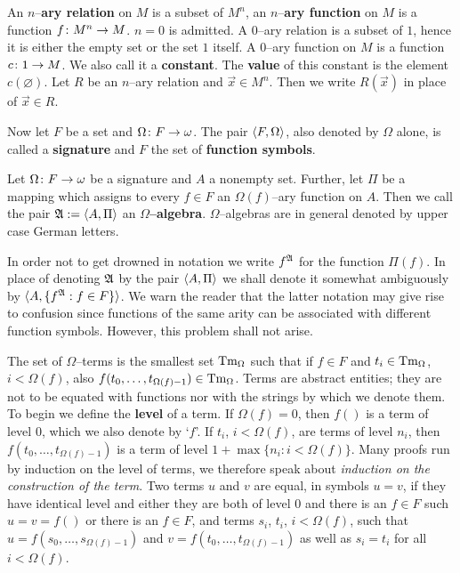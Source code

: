 An $n$--\textbf{ary relation} on $M$ is a subset of $M^n$,
an $n$--\textbf{ary function} on $M$ is a function $f \colon M^n \rightarrow M$.
$n = 0$ is admitted. A 0--ary relation is a subset of $1$, hence 
it is either the empty set or the set $1$ itself. A 0--ary function 
on $M$ is a function $c \colon 1 \rightarrow M$. We also call it a 
\textbf{constant}.
The \textbf{value} of this constant is the element $c(\varnothing)$.
Let $R$ be an $n$--ary relation and $\vec{x} \in M^n$. Then we
write $R(\vec{x})$ in place of $\vec{x} \in R$.

Now let $F$ be a set and $\Omega \colon F \rightarrow \omega$.
The pair $\langle F, \Omega\rangle$, also denoted by $\Omega$
alone, is called a \textbf{signature} and $F$ the set of
\textbf{function symbols}.
\begin{defn}
Let $\Omega \colon F \rightarrow \omega$ be a signature and $A$
a nonempty set. Further, let $\Pi$ be a mapping
which assigns to every $f \in F$ an $\Omega(f)$--ary
function on $A$. Then we call the pair $\mathfrak{A} := \langle
A, \Pi\rangle$ an \textbf{$\Omega$--algebra}. $\Omega$--algebras
are in general denoted by upper case German letters.
\end{defn}
In order not to get drowned in notation we write $f^{\mathfrak{A}}$ 
for the function $\Pi(f)$. In place of denoting $\mathfrak{A}$ by the 
pair $\langle A, \Pi\rangle$ we shall denote it somewhat ambiguously 
by $\langle A, \{f^{\mathfrak{A}} : f \in F\}\rangle$. We warn the reader that 
the latter notation may give rise to confusion since
functions of the same arity can be associated with different
function symbols. However, this problem shall not arise.

\index{$\Tm_{\Omega}$}%
The set of $\Omega$--terms is the smallest set $\Tm_{\Omega}$ 
such that if $f \in F$ and $t_i \in \operatorname{Tm}_{\Omega}$, 
$i < \Omega(f)$, also $f(t_0, \dotsc, t_{\Omega(f)-1}) \in
    \operatorname{Tm}_{\Omega}$.
Terms are abstract entities; they are not to be equated
with functions nor with the strings by which we denote them.
%
To begin we define the \textbf{level} of a term. If $\Omega(f) = 0$,
then $f()$ is a term of level 0, which we also denote by `$f$'.
If $t_i$, $i < \Omega(f)$, are terms of level $n_i$,
then $f(t_0, \dotsc, t_{\Omega(f)-1})$ is a term of level
$1 + \max \{n_i : i < \Omega(f)\}$. Many proofs
run by induction on the level of terms, we therefore speak about
{\it induction on the construction of the term}. Two terms $u$ and
$v$ are equal, in symbols $u = v$, if they have identical level and
either they are both of level 0 and there is an $f \in F$ such
$u = v = f()$ or there is an $f \in F$, and terms $s_i$, $t_i$,
$i < \Omega(f)$, such that $u = f(s_0, \dotsc, s_{\Omega(f)-1})$
and $v = f(t_0, \dotsc, t_{\Omega(f) -1})$ as well as $s_i = t_i$
for all $i < \Omega(f)$.

